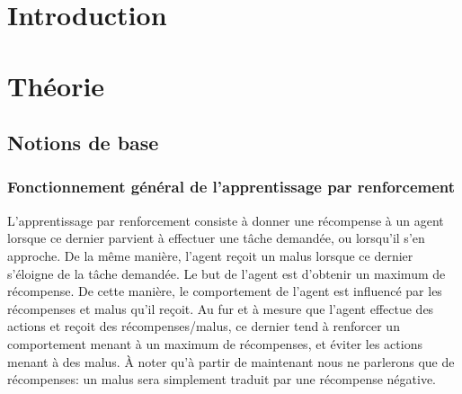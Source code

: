 \documentclass[11pt,a4paper]{report}
\title{\vartitle}
\author{\varauthor}
\date{\vardate}
\begin{document}
  \begin{titlepage}
    \maketitle

    \thispagestyle{empty}

    \begin{abstract}
    // TODO
    \end{abstract}


  \end{titlepage}
  
  \newpage
  
  \tableofcontents
  
  \newpage

  \chapter{Introduction}
  
  \chapter{Théorie}
  
  \section{Notions de base}
  
  \subsection{Fonctionnement général de l'apprentissage par renforcement}
  
    \par L'apprentissage par renforcement consiste à donner une récompense à un agent lorsque ce dernier parvient à effectuer une tâche demandée, ou lorsqu'il s'en approche. De la même manière, l'agent reçoit un malus lorsque ce dernier s'éloigne de la tâche demandée. Le but de l'agent est d'obtenir un maximum de récompense. De cette manière, le comportement de l'agent est influencé par les récompenses et malus qu'il reçoit. Au fur et à mesure que l'agent effectue des actions et reçoit des récompenses/malus, ce dernier tend à renforcer un comportement menant à un maximum de récompenses, et éviter les actions menant à des malus. À noter qu'à partir de maintenant nous ne parlerons que de récompenses: un malus sera simplement traduit par une récompense négative. 
  
\end{document}
